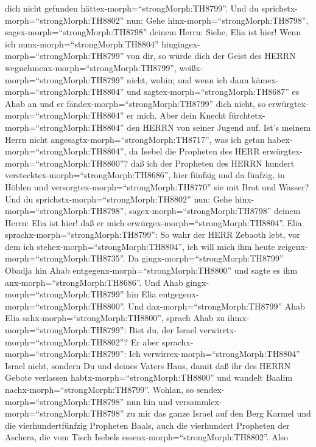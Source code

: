 dich nicht gefunden hättex-morph=``strongMorph:TH8799''. 
Und du sprichstx-morph=``strongMorph:TH8802'' nun: Gehe
hinx-morph=``strongMorph:TH8798'', sagex-morph=``strongMorph:TH8798''
deinem Herrn: Siehe, Elia ist hier!  Wenn ich
nunx-morph=``strongMorph:TH8804'' hingingex-morph=``strongMorph:TH8799''
von dir, so würde dich der Geist des HERRN
wegnehmenx-morph=``strongMorph:TH8799'',
weißx-morph=``strongMorph:TH8799'' nicht, wohin; und wenn ich dann
kämex-morph=``strongMorph:TH8804'' und
sagtex-morph=``strongMorph:TH8687'' es Ahab an und er
fändex-morph=``strongMorph:TH8799'' dich nicht, so
erwürgtex-morph=``strongMorph:TH8804'' er mich. Aber dein Knecht
fürchtetx-morph=``strongMorph:TH8804'' den HERRN von seiner Jugend auf.
 Ist's meinem Herrn nicht
angesagtx-morph=``strongMorph:TH8717'', was ich getan
habex-morph=``strongMorph:TH8804'', da Isebel die Propheten des HERR
erwürgtex-morph=``strongMorph:TH8800''? daß ich der Propheten des HERRN
hundert verstecktex-morph=``strongMorph:TH8686'', hier fünfzig und da
fünfzig, in Höhlen und versorgtex-morph=``strongMorph:TH8770'' sie mit
Brot und Wasser?  Und du
sprichstx-morph=``strongMorph:TH8802'' nun: Gehe
hinx-morph=``strongMorph:TH8798'', sagex-morph=``strongMorph:TH8798''
deinem Herrn: Elia ist hier! daß er mich
erwürgex-morph=``strongMorph:TH8804''.  Elia
sprachx-morph=``strongMorph:TH8799'': So wahr der HERR Zebaoth lebt, vor
dem ich stehex-morph=``strongMorph:TH8804'', ich will mich ihm heute
zeigenx-morph=``strongMorph:TH8735''.  Da
gingx-morph=``strongMorph:TH8799'' Obadja hin Ahab
entgegenx-morph=``strongMorph:TH8800'' und sagte es ihm
anx-morph=``strongMorph:TH8686''. Und Ahab
gingx-morph=``strongMorph:TH8799'' hin Elia
entgegenx-morph=``strongMorph:TH8800''.  Und
dax-morph=``strongMorph:TH8799'' Ahab Elia
sahx-morph=``strongMorph:TH8800'', sprach Ahab zu
ihmx-morph=``strongMorph:TH8799'': Bist du, der Israel
verwirrtx-morph=``strongMorph:TH8802''?  Er aber
sprachx-morph=``strongMorph:TH8799'': Ich
verwirrex-morph=``strongMorph:TH8804'' Israel nicht, sondern Du und
deines Vaters Haus, damit daß ihr des HERRN Gebote verlassen
habtx-morph=``strongMorph:TH8800'' und wandelt Baalim
nachx-morph=``strongMorph:TH8799''.  Wohlan, so
sendex-morph=``strongMorph:TH8798'' nun hin und
versammlex-morph=``strongMorph:TH8798'' zu mir das ganze Israel auf den
Berg Karmel und die vierhundertfünfzig Propheten Baals, auch die
vierhundert Propheten der Aschera, die vom Tisch Isebels
essenx-morph=``strongMorph:TH8802''.  Also
